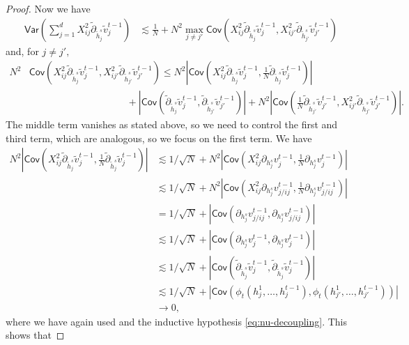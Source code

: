 \documentclass{article}
\newcommand{\1}{\mathbbm{1}}
\theoremstyle{plain}
\theoremstyle{definition}
\theoremstyle{remark}
\newcommand{\Var}{\mathsf{Var}}
\newcommand{\Cov}{\mathsf{Cov}}
\begin{document}
\begin{proof}
    
    Now we have 
    \begin{align*}
        \Var\left(\sum_{j=1}^d X_{ij}^2\tilde{\partial}_{\tilde{h}_j^s} \tilde{v}_j^{t-1} \right) &\lesssim \frac{1}{N} + N^2\max_{j\neq j'}\Cov(X_{ij}^2\tilde{\partial}_{\tilde{h}_j^s} \tilde{v}_j^{t-1}, X_{ij'}^2\tilde{\partial}_{\tilde{h}_{j'}^s} \tilde{v}_{j'}^{t-1})
    \end{align*}
    and, for $j\neq j',$
    \begin{align*}
    N^2&\Cov(X_{ij}^2\tilde{\partial}_{\tilde{h}_j^s} \tilde{v}_j^{t-1}, X_{ij'}^2\tilde{\partial}_{\tilde{h}_{j'}^s} \tilde{v}_{j'}^{t-1})  \leq N^2|\Cov(X_{ij}^2\tilde{\partial}_{\tilde{h}_j^s} \tilde{v}_j^{t-1}, \frac{1}{N}\tilde{\partial}_{\tilde{h}_j^s} \tilde{v}_j^{t-1})| \\
    &\qquad \qquad\qquad\qquad\qquad+ |\Cov(\tilde{\partial}_{\tilde{h}_j^s} \tilde{v}_j^{t-1}, \tilde{\partial}_{\tilde{h}_{j'}^s} \tilde{v}_{j'}^{t-1})| +N^2 |\Cov(\frac{1}{N}\tilde{\partial}_{\tilde{h}_{j'}^s} \tilde{v}_{j'}^{t-1}, X_{ij'}^2\tilde{\partial}_{\tilde{h}_{j'}^s} \tilde{v}_{j'}^{t-1})|.
    \end{align*}
    The middle term vanishes as stated above, so we need to control the first and third term, which are analogous, so we focus on the first term. We have 
    \begin{align*}
        N^2|\Cov(X_{ij}^2\tilde{\partial}_{\tilde{h}_j^s} \tilde{v}_j^{t-1}, \frac{1}{N}\tilde{\partial}_{\tilde{h}_j^s} \tilde{v}_j^{t-1})| &\lesssim 1/\sqrt{N} +N^2 |\Cov(X_{ij}^2{\partial}_{{h}_j^s} {v}_j^{t-1}, \frac{1}{N}{\partial}_{{h}_j^s} {v}_j^{t-1})| \\
        &\lesssim 1/\sqrt{N} +N^2 |\Cov(X_{ij}^2{\partial}_{{h}_j^s} {v}_{j/ij}^{t-1}, \frac{1}{N}{\partial}_{{h}_j^s} {v}_{j/ij}^{t-1})| \\
        &=1/\sqrt{N} + |\Cov({\partial}_{{h}_j^s} {v}_{j/ij}^{t-1}, {\partial}_{{h}_j^s} {v}_{j/ij}^{t-1})| \\
        &\lesssim 1/\sqrt{N} + |\Cov({\partial}_{{h}_j^s} {v}_{j}^{t-1}, {\partial}_{{h}_j^s} {v}_{j}^{t-1})| \\
        &\lesssim 1/\sqrt{N} + |\Cov(\tilde{\partial}_{\tilde{h}_j^s} \tilde{v}_{j}^{t-1}, \tilde{\partial}_{\tilde{h}_j^s} \tilde{v}_{j}^{t-1})| \\
        &\lesssim 1/\sqrt{N} + |\Cov(\phi_t(h_j^1,\dots,h_j^{t-1}), \phi_t(h_{j'}^1,\dots,h_{j'}^{t-1}))| \\
        &\to 0,
    \end{align*}
    where we have again used  and the inductive hypothesis \eqref{eq:nu-decoupling}. This shows that

\end{proof}
\end{document}
